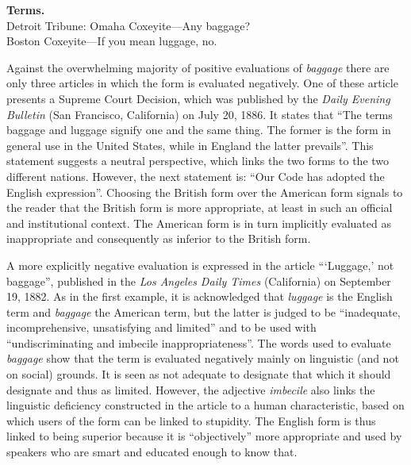 \begin{ipquote}
\textbf{Terms.}\\   
Detroit Tribune: Omaha Coxeyite—Any baggage?\\
Boston Coxeyite—If you mean luggage, no.
\end{ipquote}

Against the overwhelming majority of positive evaluations of \emph{baggage} there are only three articles in which the form is evaluated negatively. One of these article presents a Supreme Court Decision, which was published by the \emph{Daily Evening Bulletin} (San Francisco, California) on July 20, 1886. It states that “The terms baggage and luggage signify one and the same thing. The former is the form in general use in the United States, while in England the latter prevails”. This statement suggests a neutral perspective, which links the two forms to the two different nations. However, the next statement is: “Our Code has adopted the English expression”. Choosing the British form over the American form signals to the reader that the British form is more appropriate, at least in such an official and institutional context. The American form is in turn implicitly evaluated as inappropriate and consequently as inferior to the British form.

A more explicitly negative evaluation is expressed in the article “‘Luggage,’ not baggage”, published in the \emph{Los Angeles Daily Times} (California) on September 19, 1882. As in the first example, it is acknowledged that \emph{luggage} is the English term and \emph{baggage} the American term, but the latter is judged to be “inadequate, incomprehensive, unsatisfying and limited” and to be used with “undiscriminating and imbecile inappropriateness”. The words used to evaluate \emph{baggage} show that the term is evaluated negatively mainly on linguistic (and not on social) grounds. It is seen as not adequate to designate that which it should designate and thus as limited. However, the adjective \emph{imbecile} also links the linguistic deficiency constructed in the article to a human characteristic, based on which users of the form can be linked to stupidity. The English form is thus linked to being superior because it is “objectively” more appropriate and used by speakers who are smart and educated enough to know that.

